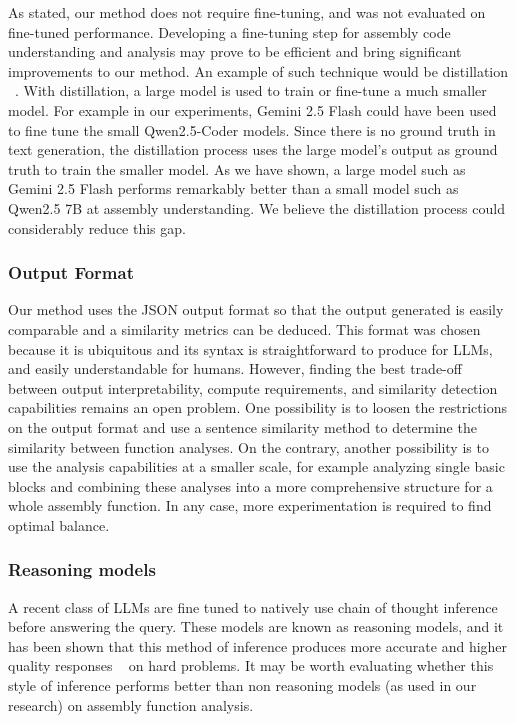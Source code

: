 As stated, our method does not require fine-tuning, and was not evaluated on fine-tuned performance. Developing a fine-tuning step
for assembly code understanding and analysis may prove to be efficient and bring significant improvements to our method.
An example of such technique would be distillation ~\cite{distillation}. With distillation, a large model is used to train or fine-tune a
much smaller model. For example in our experiments, Gemini 2.5 Flash could have been used to fine tune the small Qwen2.5-Coder models.
Since there is no ground truth in text generation, the distillation process uses the large model's output as ground truth
to train the smaller model. As we have shown, a large model such as Gemini 2.5 Flash performs remarkably better than a
small model such as Qwen2.5 7B at assembly understanding. We believe the distillation process could considerably reduce this gap.

\subsubsection{Output Format}

Our method uses the JSON output format so that the output generated is easily comparable and a similarity metrics can be deduced.
This format was chosen because it is ubiquitous and its syntax is straightforward to produce for LLMs, and easily understandable for humans.
However, finding the best trade-off between output interpretability, compute requirements, and similarity detection capabilities remains
an open problem. One possibility is to loosen the restrictions on the output format and use a sentence similarity method to determine
the similarity between function analyses. On the contrary, another possibility is to use the analysis capabilities at a smaller scale,
for example analyzing single basic blocks and combining these analyses into a more comprehensive structure for a whole assembly function.
In any case, more experimentation is required to find optimal balance.

\subsubsection{Reasoning models}

A recent class of LLMs are fine tuned to natively use chain of thought inference ~\cite{c-o-t} before answering the query.
These models are known as reasoning models, and it has been shown that this method of inference produces more accurate and
higher quality responses ~\cite{c-o-t,reasoning,thinking-llm} on hard problems. It may be worth evaluating whether this style
of inference performs better than non reasoning models (as used in our research) on assembly function analysis.

